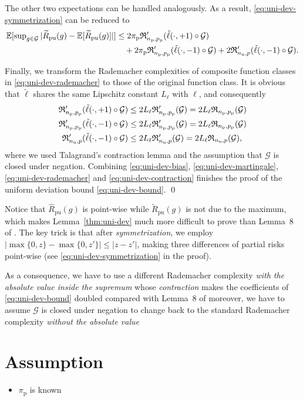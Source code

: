 \documentclass[12pt]{article}
\newcommand{\bE}{\mathbb{E}}
\newcommand{\cG}{\mathcal{G}}
\newcommand{\fR}{\mathfrak{R}}
\newcommand{\prp}{p_\mathrm{p}}
\newcommand{\pip}{\pi_\mathrm{p}}
\newcommand{\Np}{{n_\mathrm{p}}}
\newcommand{\Nu}{{n_\mathrm{u}}}
\newcommand{\hRpu}{\widehat{R}_\mathrm{pu}}
\newcommand{\tRpu}{\widetilde{R}_\mathrm{pu}}
\theoremstyle{definition}
\begin{document}
The other two expectations can be handled analogously. As a result, \eqref{eq:uni-dev-symmetrization} can be reduced to
\begin{align}
\bE[\sup\nolimits_{g\in\cG}|\tRpu(g)-\bE[\tRpu(g)]|]
&\le 2\pip\fR'_{\Np,\prp}(\tilde{\ell}(\cdot,+1)\circ\cG) \notag\\
\label{eq:uni-dev-rademacher}%
&\quad +2\pip\fR'_{\Np,\prp}(\tilde{\ell}(\cdot,-1)\circ\cG)
+2\fR'_{\Nu,p}(\tilde{\ell}(\cdot,-1)\circ\cG).
\end{align}

Finally, we transform the Rademacher complexities of composite function classes in \eqref{eq:uni-dev-rademacher} to those of the original function class. It is obvious that $\tilde{\ell}$ shares the same Lipschitz constant $L_\ell$ with $\ell$, and consequently
\begin{align}
\fR'_{\Np,\prp}(\tilde{\ell}(\cdot,+1)\circ\cG)
&\le 2L_\ell\fR'_{\Np,\prp}(\cG)
= 2L_\ell\fR_{\Np,\prp}(\cG) \notag\\
\label{eq:uni-dev-contraction}%
\fR'_{\Np,\prp}(\tilde{\ell}(\cdot,-1)\circ\cG)
&\le 2L_\ell\fR'_{\Np,\prp}(\cG)
= 2L_\ell\fR_{\Np,\prp}(\cG)\\
\fR'_{\Nu,p}(\tilde{\ell}(\cdot,-1)\circ\cG)
&\le 2L_\ell\fR'_{\Nu,p}(\cG)
= 2L_\ell\fR_{\Nu,p}(\cG), \notag
\end{align}
where we used Talagrand's contraction lemma and the assumption that $\cG$ is closed under negation. Combining \eqref{eq:uni-dev-bias}, \eqref{eq:uni-dev-martingale}, \eqref{eq:uni-dev-rademacher} and \eqref{eq:uni-dev-contraction} finishes the proof of the uniform deviation bound \eqref{eq:uni-dev-bound}. \qed

Notice that $\hRpu(g)$ is point-wise while $\tRpu(g)$ is not due to the maximum, which makes Lemma~\ref{thm:uni-dev} much more difficult to prove than Lemma~8 of \cite{niu2016theoretical}. The key trick is that after \emph{symmetrization}, we employ $|\max\{0,z\}-\max\{0,z'\}|\le|z-z'|$, making three differences of partial risks point-wise (see \eqref{eq:uni-dev-symmetrization} in the proof). 

As a consequence, we have to use a different Rademacher complexity \emph{with the absolute value inside the supremum}  whose \emph{contraction} makes the coefficients of \eqref{eq:uni-dev-bound} doubled compared with Lemma~8 of \cite{niu2016theoretical} moreover, we have to assume $\cG$ is closed under negation to change back to the standard Rademacher complexity \emph{without the absolute value} 
 
\section{Assumption}
\begin{itemize}
	\item $\pi_\mathrm{p}$ is known

\end{itemize}






\vspace{1cm}


\end{document}
